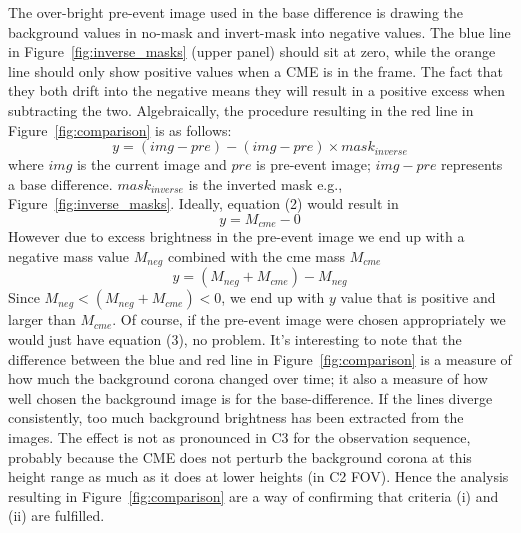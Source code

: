 The over-bright pre-event image used in the base difference is drawing the background values in no-mask and invert-mask into negative values. The blue line in Figure~\ref{fig:inverse_masks} (upper panel) should sit at zero, while the orange line should only show positive values when a CME is in the frame. The fact that they both drift into the negative means they will result in a positive excess when subtracting the two.
Algebraically, the procedure resulting in the red line in Figure~\ref{fig:comparison} is as follows:
\begin{equation}
y = (img - pre) - (img - pre)\times mask_{inverse}
\end{equation}
where $img$ is the current image and $pre$ is pre-event image; $img - pre$ represents a base difference. $mask_{inverse}$ is the inverted mask e.g., Figure~\ref{fig:inverse_masks}. Ideally, equation (2) would result in
\begin{equation}
y = M_{cme} - 0
\end{equation}
However due to excess brightness in the pre-event image we end up with a negative mass value $M_{neg}$ combined with the cme mass $M_{cme}$
\begin{equation}
y = (M_{neg} + M_{cme})  - M_{neg}
\end{equation}
Since $M_{neg} < (M_{neg} + M_{cme}   ) < 0$, we end up with $y$ value that is positive and larger than $M_{cme}$. Of course, if the pre-event image were chosen appropriately we would just have equation (3), no problem. It's interesting to note that the difference between the blue and red line in Figure~\ref{fig:comparison} is a measure of how much the background corona changed over time; it also a measure of how well chosen the background image is for the base-difference. If the lines diverge consistently, too much background brightness has been extracted from the images. The effect is not as pronounced in C3 for the observation sequence, probably because the CME does not perturb the background corona at this height range as much as it does at lower heights (in C2 FOV). Hence the analysis resulting in Figure~\ref{fig:comparison} are a way of confirming that criteria (i) and (ii) are fulfilled.

